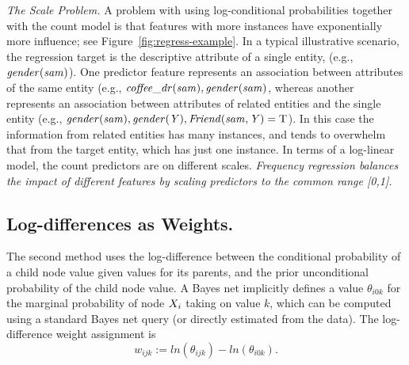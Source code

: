 \documentclass[twoside,leqno,twocolumn]{article}
\begin{document}
{\em The Scale Problem.} 
A problem with using log-conditional probabilities together with the count model is that features with more instances have exponentially more influence; see Figure~\ref{fig:regress-example}. In a typical illustrative scenario, the regression target is the descriptive attribute of a single entity, (e.g., $\it{gender}(sam)$). One predictor feature represents an association between attributes of the same entity (e.g., $\it{coffee\_dr}(sam),\it{gender}(sam)$, whereas another represents an association between attributes of related entities and the single entity (e.g., $\it{gender}(sam), \it{gender}(Y),\it{Friend}(\it{sam},Y) = \mathrm{T}$). In this case the information from related entities has many instances, and tends to overwhelm that from the target entity, which has just one instance. In terms of a log-linear model, the count predictors are on different scales. 
{\em Frequency regression balances the impact of different features by scaling predictors to the common range [0,1].}  

\subsection{Log-differences as Weights.} \label{sec:log-diff}
The second method uses the log-difference between the conditional probability of a child node value given values for its parents, and the prior unconditional probability of the child node value. 
A Bayes net implicitly defines a value $\theta_{i0k}$ for the marginal probability of node $X_{i}$ taking on value $k$, which can be computed using a standard Bayes net query (or directly estimated from the data).
%
%
The log-difference weight assignment is 
\begin{equation*}
w_{ijk} := ln(\theta_{ijk}) - ln(\theta_{i0k}).
\end{equation*}
\end{document}
